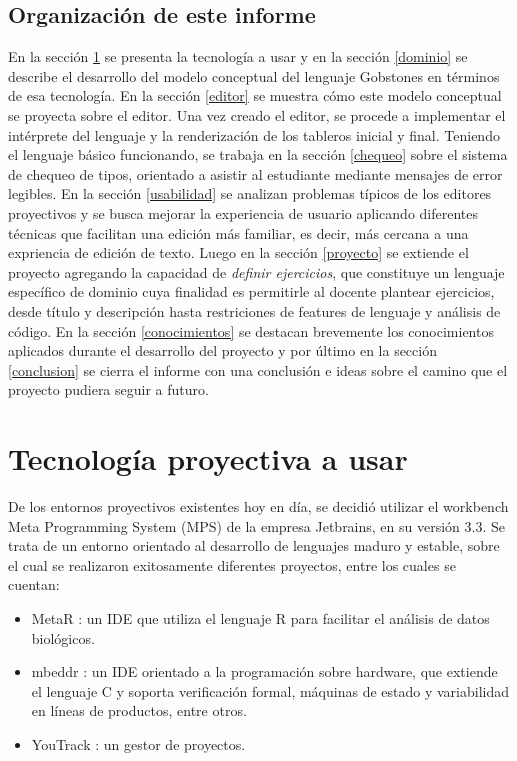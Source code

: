 \subsection{Organización de este informe}

En la sección \ref{tecnologias} se presenta la tecnología a usar y en la sección \ref{dominio} se describe el desarrollo del modelo conceptual del lenguaje Gobstones en términos de esa tecnología. En la sección \ref{editor} se muestra cómo este modelo conceptual se proyecta sobre el editor. Una vez creado el editor, se procede a implementar el intérprete del lenguaje y la renderización de los tableros inicial y final. Teniendo el lenguaje básico funcionando, se trabaja en la sección \ref{chequeo} sobre el sistema de chequeo de tipos, orientado a asistir al estudiante mediante mensajes de error legibles. En la sección \ref{usabilidad} se analizan problemas típicos de los editores proyectivos y se busca mejorar la experiencia de usuario aplicando diferentes técnicas que facilitan una edición más familiar, es decir, más cercana a una expriencia de edición de texto. Luego en la sección \ref{proyecto} se extiende el proyecto agregando la capacidad de \textit{definir ejercicios}, que constituye un lenguaje específico de dominio cuya finalidad es permitirle al docente plantear ejercicios, desde título y descripción hasta restriciones de features de lenguaje y análisis de código. En la sección \ref{conocimientos} se destacan brevemente los conocimientos aplicados durante el desarrollo del proyecto y por último en la sección \ref{conclusion} se cierra el informe con una conclusión e ideas sobre el camino que el proyecto pudiera seguir a futuro.

\section{Tecnología proyectiva a usar}\label{tecnologias}

De los entornos proyectivos existentes hoy en día, se decidió utilizar el workbench Meta Programming System (MPS)  \cite{LanguageModularity} de la empresa Jetbrains, en su versión 3.3.
Se trata de un entorno orientado al desarrollo de lenguajes maduro y estable, sobre el cual se realizaron exitosamente diferentes proyectos, entre los cuales se cuentan:
\begin{itemize}
\item MetaR : un IDE que utiliza el lenguaje R para facilitar el análisis de datos biológicos.
\item mbeddr : un IDE orientado a la programación sobre hardware, que extiende el lenguaje C y soporta verificación formal, máquinas de estado y variabilidad en líneas de productos, entre otros.
\item YouTrack : un gestor de proyectos.
\end{itemize}

